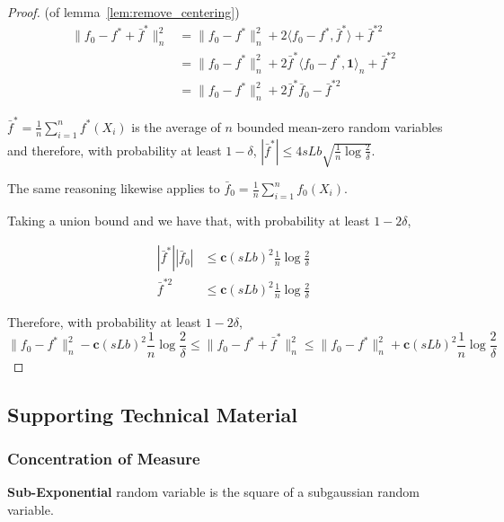 \begin{proof} (of lemma~\ref{lem:remove_centering})
\begin{align*}
\| f_0 - f^* + \bar{f}^* \|_n^2 &= \| f_0 - f^* \|_n^2 
    + 2 \langle f_0 - f^*, \bar{f}^* \rangle + \bar{f}^{*2} \\
  &= \| f_0 - f^* \|_n^2 + 2 \bar{f}^* \langle f_0 - f^*, \mathbf{1} \rangle_n + 
    \bar{f}^{*2} \\
  &= \| f_0 - f^* \|_n^2 + 2 \bar{f}^* \bar{f}_0 - \bar{f}^{*2}
\end{align*}


$\bar{f}^* = \frac{1}{n} \sum_{i=1}^n f^*(X_i)$ is the average of $n$ bounded mean-zero random variables and therefore, with probability at least $1-\delta$, $| \bar{f}^* | \leq 4 s L b \sqrt{ \frac{1}{n} \log \frac{2}{\delta} }$.

The same reasoning likewise applies to $\bar{f}_0 = \frac{1}{n} \sum_{i=1}^n f_0(X_i)$.

Taking a union bound and we have that, with probability at least $1- 2\delta$, 

\begin{align*}
| \bar{f}^* | | \bar{f}_0 | &\leq \mathbf{c} (sLb)^2 \frac{1}{n} \log \frac{2}{\delta} \\
\bar{f}^{*2} &\leq \mathbf{c} (sLb)^2 \frac{1}{n} \log \frac{2}{\delta}
\end{align*}

Therefore, with probability at least $1 - 2\delta$,
\[
\|f_0 - f^*\|_n^2 - \mathbf{c} (sLb)^2 \frac{1}{n} \log \frac{2}{\delta} \leq
    \| f_0 - f^* + \bar{f}^* \|_n^2 \leq 
\|f_0 - f^*\|_n^2 + \mathbf{c} (sLb)^2 \frac{1}{n} \log \frac{2}{\delta}
\]

\end{proof}





 \subsection{Supporting Technical Material}
 
 \subsubsection{Concentration of Measure}

\textbf{Sub-Exponential} random variable is the square of a subgaussian random variable\cite{vershynin2010introduction}.

